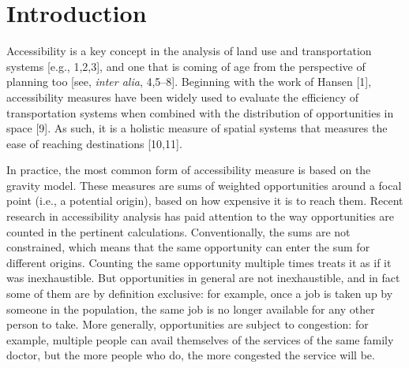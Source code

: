 \documentclass[10pt,letterpaper]{article}
\begin{document}

\linenumbers

\hypertarget{introduction}{%
\section{Introduction}\label{introduction}}

Accessibility is a key concept in the analysis of land use and
transportation systems {[}e.g., 1,2,3{]}, and one that is coming of age
from the perspective of planning too {[}see, \emph{inter alia},
4,5--8{]}. Beginning with the work of Hansen {[}1{]}, accessibility
measures have been widely used to evaluate the efficiency of
transportation systems when combined with the distribution of
opportunities in space {[}9{]}. As such, it is a holistic measure of
spatial systems that measures the ease of reaching destinations
{[}10,11{]}.

In practice, the most common form of accessibility measure is based on
the gravity model. These measures are sums of weighted opportunities
around a focal point (i.e., a potential origin), based on how expensive
it is to reach them. Recent research in accessibility analysis has paid
attention to the way opportunities are counted in the pertinent
calculations. Conventionally, the sums are not constrained, which means
that the same opportunity can enter the sum for different origins.
Counting the same opportunity multiple times treats it as if it was
inexhaustible. But opportunities in general are not inexhaustible, and
in fact some of them are by definition exclusive: for example, once a
job is taken up by someone in the population, the same job is no longer
available for any other person to take. More generally, opportunities
are subject to congestion: for example, multiple people can avail
themselves of the services of the same family doctor, but the more
people who do, the more congested the service will be.
\end{document}
